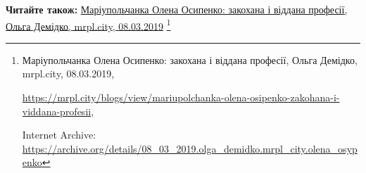  
 
 
 
 

\textbf{Читайте також:} \href{https://archive.org/details/08_03_2019.olga_demidko.mrpl_city.olena_osypenko}{%
Маріупольчанка Олена Осипенко: закохана і віддана професії, Ольга Демідко, mrpl.city, 08.03.2019}%
\footnote{Маріупольчанка Олена Осипенко: закохана і віддана професії, Ольга Демідко, mrpl.city, 08.03.2019, \par%
\url{https://mrpl.city/blogs/view/mariupolchanka-olena-osipenko-zakohana-i-viddana-profesii}, \par%
Internet Archive: \url{https://archive.org/details/08_03_2019.olga_demidko.mrpl_city.olena_osypenko}
}
